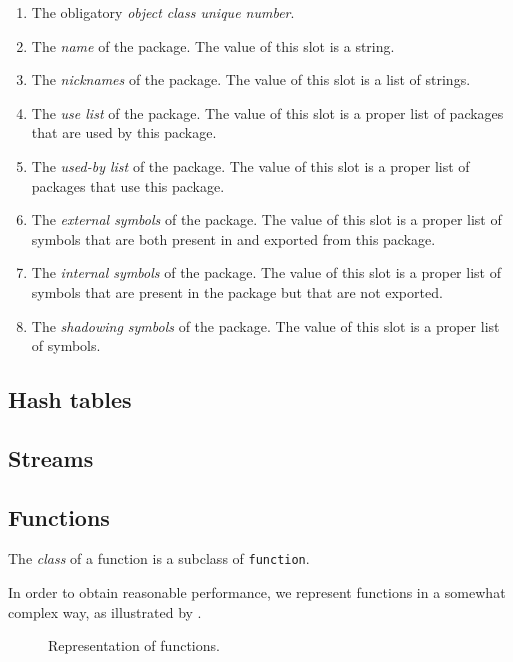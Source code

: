 \begin{enumerate}
\item The obligatory \emph{object class unique number}.
\item The \emph{name} of the package.  The value of this slot is a
  string.
\item The \emph{nicknames} of the package.  The value of this slot is
  a list of strings. 
\item The \emph{use list} of the package.  The value of this slot is a
  proper list of packages that are used by this package. 
\item The \emph{used-by list} of the package.  The value of this slot
is a proper list of packages that use this package. 
\item The \emph{external symbols} of the package.  The value of this
  slot is a proper list of symbols that are both present in and
  exported from this package.
\item The \emph{internal symbols} of the package.  The value of this
  slot is a proper list of symbols that are present in the package but
  that are not exported.
\item The \emph{shadowing symbols} of the package.  The value of this
  slot is a proper list of symbols. 
\end{enumerate}

\subsection{Hash tables}

\subsection{Streams}

\subsection{Functions}
\label{sec-data-representation-functions}

The \emph{class} of a function is a subclass of \texttt{function}.

In order to obtain reasonable performance, we represent functions in a
somewhat complex way, as illustrated by
. 

\begin{figure}
\begin{center}
\end{center}
\caption{\label{fig-function-representation}
Representation of functions.}
\end{figure}

